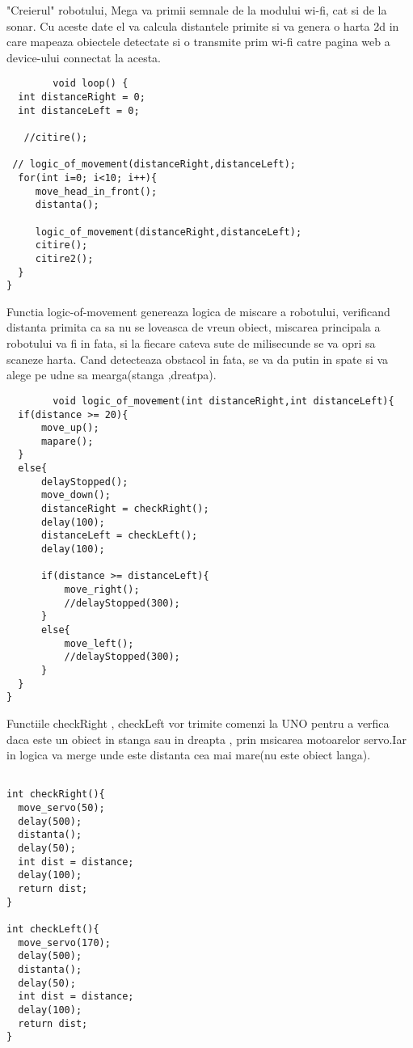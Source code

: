 \begin{itemize}
	\tab "Creierul" robotului, Mega va primii semnale de la modului wi-fi, cat si de la sonar. Cu aceste date el va calcula distantele primite si  va genera o harta 2d in care mapeaza obiectele detectate si o transmite prim wi-fi catre pagina web a device-ului connectat la acesta.\\
	\begin{verbatim}
		void loop() {  
  int distanceRight = 0;
  int distanceLeft = 0;

   //citire();
   
 // logic_of_movement(distanceRight,distanceLeft);
  for(int i=0; i<10; i++){
     move_head_in_front();
     distanta();
     
     logic_of_movement(distanceRight,distanceLeft);
     citire();
     citire2();
  }
}
	\end{verbatim}

	\tab Functia logic-of-movement genereaza logica de miscare a robotului, verificand distanta primita ca sa nu se loveasca de vreun obiect, miscarea principala a robotului va fi in fata, si la fiecare cateva sute de milisecunde se va opri sa scaneze harta. Cand detecteaza obstacol in fata, se va da putin in spate si va alege pe udne sa mearga(stanga ,dreatpa).\\
	\begin{verbatim}
		void logic_of_movement(int distanceRight,int distanceLeft){
  if(distance >= 20){
      move_up();
      mapare();
  }
  else{
      delayStopped();
      move_down();
      distanceRight = checkRight();
      delay(100);
      distanceLeft = checkLeft();
      delay(100);

      if(distance >= distanceLeft){
          move_right();
          //delayStopped(300);
      }
      else{
          move_left();
          //delayStopped(300);
      }
  }
}
	\end{verbatim}

	\tab Functiile checkRight , checkLeft vor trimite comenzi la UNO pentru a verfica daca este un obiect in stanga sau in dreapta , prin msicarea motoarelor servo.Iar in logica va merge unde este distanta cea mai mare(nu este obiect langa).\\
	\begin{verbatim}
		
int checkRight(){
  move_servo(50);
  delay(500);
  distanta();
  delay(50);
  int dist = distance;
  delay(100);
  return dist;
}

int checkLeft(){
  move_servo(170);
  delay(500);
  distanta();
  delay(50);
  int dist = distance;
  delay(100);
  return dist;
}


\end{verbatim}
\end{itemize}
